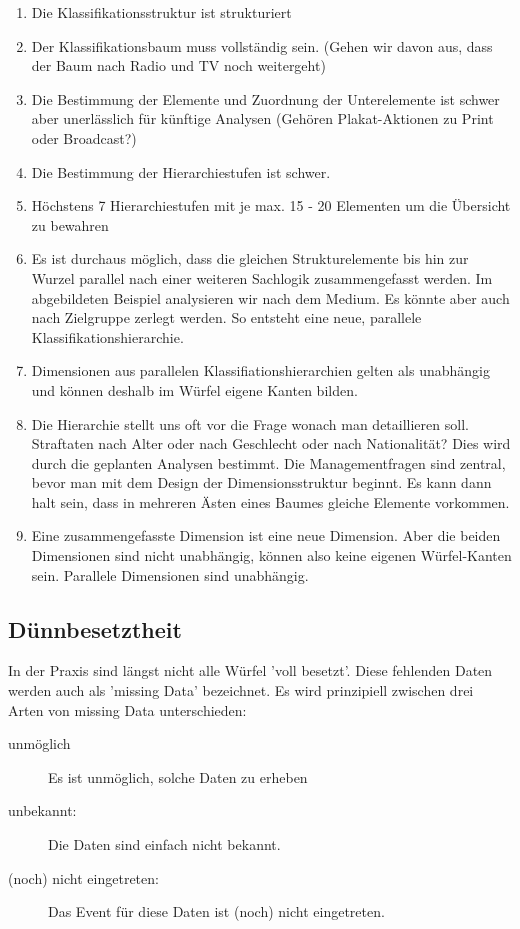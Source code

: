 \documentclass[a4paper, 11pt, nofootinbib]{article}
\begin{document}
\begin{enumerate}
	\item Die Klassifikationsstruktur ist strukturiert
	\item Der Klassifikationsbaum muss vollständig sein. (Gehen wir davon aus, dass der Baum nach Radio und TV noch weitergeht)
	\item Die Bestimmung der Elemente und Zuordnung der Unterelemente ist schwer aber unerlässlich für künftige Analysen (Gehören Plakat-Aktionen zu Print oder Broadcast?)
	\item Die Bestimmung der Hierarchiestufen ist schwer.
	\item Höchstens 7 Hierarchiestufen mit je max. 15 - 20 Elementen um die Übersicht zu bewahren
	\item Es ist durchaus möglich, dass die gleichen Strukturelemente bis hin zur Wurzel parallel nach einer weiteren Sachlogik zusammengefasst werden. Im abgebildeten Beispiel analysieren wir nach dem Medium. Es könnte aber auch nach Zielgruppe zerlegt werden. So entsteht eine neue, parallele Klassifikationshierarchie.
	\item Dimensionen aus parallelen Klassifiationshierarchien gelten als unabhängig und können deshalb im Würfel eigene Kanten bilden.
	\item Die Hierarchie stellt uns oft vor die Frage wonach man detaillieren soll. Straftaten nach Alter oder nach Geschlecht oder nach Nationalität? Dies wird durch die geplanten Analysen bestimmt. Die Managementfragen sind zentral, bevor man mit dem Design der Dimensionsstruktur beginnt. Es kann dann halt sein, dass in mehreren Ästen eines Baumes gleiche Elemente vorkommen.
	\item Eine zusammengefasste Dimension ist eine neue Dimension. Aber die beiden Dimensionen sind nicht unabhängig, können also keine eigenen Würfel-Kanten sein. Parallele Dimensionen sind unabhängig.
\end{enumerate}

\subsection{Dünnbesetztheit}
In der Praxis sind längst nicht alle Würfel 'voll besetzt'. Diese fehlenden Daten werden auch als 'missing Data' bezeichnet. Es wird prinzipiell zwischen drei Arten von missing Data unterschieden:

\begin{description}
	\item[unmöglich] Es ist unmöglich, solche Daten zu erheben
	\item[unbekannt:] Die Daten sind einfach nicht bekannt.
	\item[(noch) nicht eingetreten: ] Das Event für diese Daten ist (noch) nicht eingetreten.
\end{description}
\end{document}
